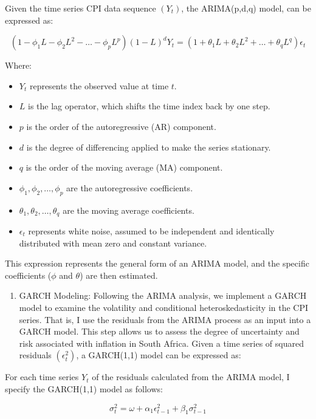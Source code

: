 \documentclass[11pt,preprint, authoryear]{elsarticle}
\numberwithin{equation}{section}
\numberwithin{figure}{section}
\numberwithin{table}{section}
\def\tightlist{} %
\begin{document}
Given the time series CPI data sequence \((Y_t)\), the ARIMA(p,d,q)
model, can be expressed as:

\[
(1 - \phi_1 L - \phi_2 L^2 - \ldots - \phi_p L^p)(1 - L)^d Y_t = (1 + \theta_1 L + \theta_2 L^2 + \ldots + \theta_q L^q) \epsilon_t 
\]

Where:

\begin{itemize}
\tightlist
\item
  \(Y_t\) represents the observed value at time \(t\).
\item
  \(L\) is the lag operator, which shifts the time index back by one
  step.
\item
  \(p\) is the order of the autoregressive (AR) component.
\item
  \(d\) is the degree of differencing applied to make the series
  stationary.
\item
  \(q\) is the order of the moving average (MA) component.
\item
  \(\phi_1, \phi_2, \ldots, \phi_p\) are the autoregressive
  coefficients.
\item
  \(\theta_1, \theta_2, \ldots, \theta_q\) are the moving average
  coefficients.
\item
  \(\epsilon_t\) represents white noise, assumed to be independent and
  identically distributed with mean zero and constant variance.
\end{itemize}

This expression represents the general form of an ARIMA model, and the
specific coefficients (\(\phi\) and \(\theta\)) are then estimated.

\begin{enumerate}
\def\labelenumi{\arabic{enumi}.}
\setcounter{enumi}{1}
\tightlist
\item
  GARCH Modeling: Following the ARIMA analysis, we implement a GARCH
  model to examine the volatility and conditional heteroskedasticity in
  the CPI series. That is, I use the residuals from the ARIMA process as
  an input into a GARCH model. This step allows us to assess the degree
  of uncertainty and risk associated with inflation in South Africa.
  Given a time series of squared residuals \((\epsilon_t^2)\), a
  GARCH(1,1) model can be expressed as:
\end{enumerate}

For each time series \(Y_t\) of the residuals calculated from the ARIMA
model, I specify the GARCH(1,1) model as follows:

\[
   \sigma_t^2 = \omega + \alpha_1 \epsilon_{t-1}^2 + \beta_1 \sigma_{t-1}^2
   \]
\end{document}
